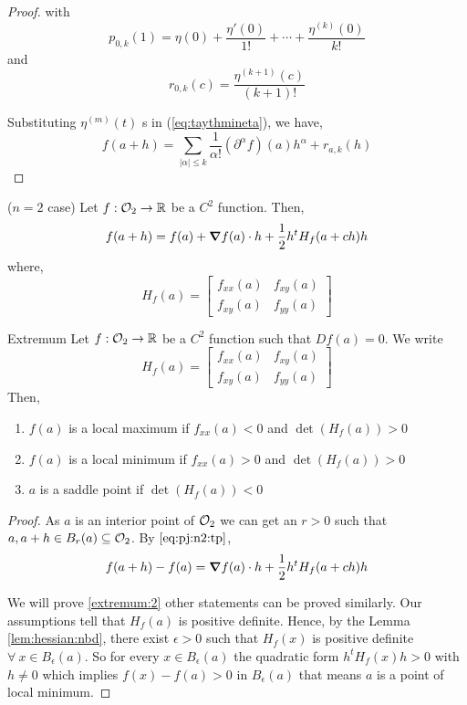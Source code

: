 \documentclass[../Analysis-3.tex]{subfiles}
\begin{document}
\begin{proof}
  with \begin{equation}
    p_{0,k}(1) = \eta(0) + \frac{\eta '(0)}{1!} + \cdots + \frac{\eta^{(k)}(0)}{k!}
  \end{equation} and
  \begin{equation}
    r_{0,k} (c) = \frac{\eta^{(k+1)}(c)}{(k+1)!}
  \end{equation}

  Substituting $\eta^{(m)}(t)$ s in (\ref{eq:taythmineta}), we have,
  \[ f(a+h) = \sum_{| \alpha | \leq k } \frac{1}{\alpha !} ({\partial}^{\alpha} f ) (a) h^{\alpha} + r_{a,k} (h) \]
\end{proof}

\begin{noteBox}
  ($n=2$ case) Let $f : \mathcal{O}_{2} \to \mathbb{R}$ be a $C^2$ function. Then,
  \begin{equation}\label{eq:pj:n2:tp}
    f(a+h) = f(a) + \grad f(a)\cdot h + \frac{1}{2}h^t H_f(a+ch)h
  \end{equation} where,
  \[ H_f(a) = \begin{bmatrix}
      f_{xx}(a) & f_{xy}(a) \\
      f_{xy}(a) & f_{yy}(a)
    \end{bmatrix} \]
\end{noteBox}

\begin{Thm}{Extremum}{}
  Let $f : \mathcal{O}_{2} \to \mathbb{R}$ be a $C^2$ function such that $Df(a) = 0$. We write \[ H_f(a) =  \begin{bmatrix}
      f_{xx}(a) & f_{xy}(a) \\
      f_{xy}(a) & f_{yy}(a)
    \end{bmatrix} \]
  Then, \begin{enumerate}[label=(\roman*)]
    \item $f(a)$ is a local maximum if $f_{xx} (a) < 0$ and $\det (H_f(a)) > 0$
    \item $f(a)$ is a local minimum if $f_{xx} (a) > 0$ and $\det (H_f(a)) > 0$ \label{extremum:2}
    \item $a$ is a saddle point if $\det (H_f(a)) < 0$
  \end{enumerate}
\end{Thm}

\begin{proof}
  As $ a $ is an interior point of $ \mathcal{O}_{2} $ we can get an $ r > 0 $ such that $ a, a+h \in B_r(a) \subseteq \mathcal{O}_{2}$. By $\eqref{eq:pj:n2:tp}$, \[ f(a+h) - f(a) = \grad f(a) \cdot h + \frac{1}{2}h^t H_f(a+ch)h \]

  We will prove \ref{extremum:2} other statements can be proved similarly. Our assumptions tell that $H_f(a)$ is positive definite. Hence, by the Lemma \ref{lem:hessian:nbd}, there exist $ \epsilon > 0 $ such that $H_f(x)$ is positive definite $\forall\ x \in B_{\epsilon}(a)$. So for every $ x \in B_{\epsilon}(a) $ the quadratic form $ h^t H_f(x) h > 0 $ with $ h \neq 0 $ which implies $ f(x) - f(a) > 0 $ in $ B_{\epsilon}(a) $ that means $a$ is a point of local minimum.
\end{proof}
\end{document}
